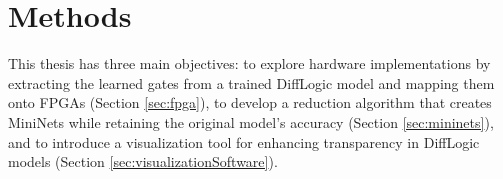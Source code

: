 \chapter{Methods}
\label{chap:methods}

This thesis has three main objectives: to explore hardware implementations by extracting the learned gates from a trained DiffLogic model and mapping them onto FPGAs (Section \ref{sec:fpga}), to develop a reduction algorithm that creates MiniNets while retaining the original model's accuracy (Section \ref{sec:mininets}), and to introduce a visualization tool for enhancing transparency in DiffLogic models (Section \ref{sec:visualizationSoftware}). 








